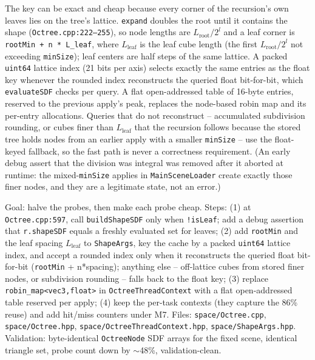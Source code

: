 \documentclass[11pt,a4paper]{article}
\begin{document}
The key can be exact and cheap because every corner of the recursion's own
leaves lies on the tree's lattice. \texttt{expand} doubles the root until it
contains the shape (\texttt{Octree.cpp:222--255}), so node lengths are
$L_{\mathrm{root}}/2^l$ and a leaf corner is \texttt{rootMin + n * L\_leaf},
where $L_{\mathrm{leaf}}$ is the leaf cube length (the first
$L_{\mathrm{root}}/2^l$ not exceeding \texttt{minSize}); leaf centers are
half steps of the same lattice. A packed \texttt{uint64} lattice index
(21 bits per axis) selects exactly the same entries as the float key whenever
the rounded index reconstructs the queried float bit-for-bit, which
\texttt{evaluateSDF} checks per query. A flat open-addressed table of 16-byte
entries, reserved to the previous apply's peak, replaces the node-based robin
map and its per-entry allocations. Queries that do not reconstruct --
accumulated subdivision rounding, or cubes finer than $L_{\mathrm{leaf}}$ that
the recursion follows because the stored tree holds nodes from an earlier
apply with a smaller \texttt{minSize} -- use the float-keyed fallback, so the
fast path is never a correctness requirement. (An early debug assert that the
division was integral was removed after it aborted at runtime: the
mixed-\texttt{minSize} applies in \texttt{MainSceneLoader} create exactly
those finer nodes, and they are a legitimate state, not an error.)

\begin{tcolorbox}[promptbox={Prompt --- C1: one leaf pass, integer corner keys}]
Goal: halve the probes, then make each probe cheap. Steps: (1) at
\texttt{Octree.cpp:597}, call \texttt{buildShapeSDF} only when
\texttt{!isLeaf}; add a debug assertion that \texttt{r.shapeSDF} equals a
freshly evaluated set for leaves; (2) add \texttt{rootMin} and the leaf
spacing $L_{\mathrm{leaf}}$ to \texttt{ShapeArgs}, key the cache by a packed
\texttt{uint64} lattice index, and accept a rounded index only when it
reconstructs the queried float bit-for-bit (\texttt{rootMin} + n*spacing);
anything else -- off-lattice cubes from stored finer nodes, or subdivision
rounding -- falls back to the float key; (3) replace
\texttt{robin\_map<vec3,float>} in \texttt{OctreeThreadContext} with a flat
open-addressed table reserved per apply; (4) keep the per-task contexts (they
capture the 86\% reuse) and add hit/miss counters under M7. Files:
\texttt{space/Octree.cpp}, \texttt{space/Octree.hpp},
\texttt{space/OctreeThreadContext.hpp}, \texttt{space/ShapeArgs.hpp}.
Validation: byte-identical \texttt{OctreeNode} SDF arrays for the fixed
scene, identical triangle set, probe count down by $\sim$48\%,
validation-clean.
\end{tcolorbox}
\end{document}
